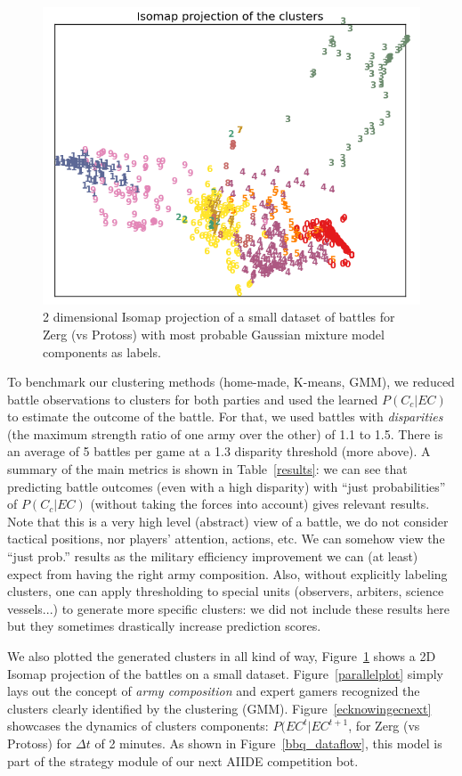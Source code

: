 \begin{figure}[htp]
\centerline{\includegraphics[width=0.55\columnwidth]{images/GMM_ISO_Z2.png}}
\label{isoz}
\caption{2 dimensional Isomap projection of a small dataset of battles for Zerg (vs Protoss) with most probable Gaussian mixture model components as labels.}
\vspace{-0.2cm}
\end{figure}

To benchmark our clustering methods (home-made, K-means, GMM), we reduced battle observations to clusters for both parties and used the learned $P(C_c|EC)$ to estimate the outcome of the battle. For that, we used battles with \textit{disparities} (the maximum strength ratio of one army over the other) of 1.1 to 1.5. There is an average of 5 battles per game at a 1.3 disparity threshold (more above). A summary of the main metrics is shown in Table~\ref{results}: we can see that predicting battle outcomes (even with a high disparity) with ``just probabilities'' of $P(C_c|EC)$ (without taking the forces into account) gives relevant results. Note that this is a very high level (abstract) view of a battle, we do not consider tactical positions, nor players' attention, actions, etc. We can somehow view the ``just prob.'' results as the military efficiency improvement we can (at least) expect from having the right army composition. Also, without explicitly labeling clusters, one can apply thresholding to special units (observers, arbiters, science vessels...) to generate more specific clusters: we did not include these results here but they sometimes drastically increase prediction scores.

We also plotted the generated clusters in all kind of way, Figure~\ref{isoz} shows a 2D Isomap projection of the battles on a small dataset. Figure~\ref{parallelplot} simply lays out the concept of \textit{army composition} and expert gamers recognized the clusters clearly identified by the clustering (GMM). Figure~\ref{ecknowingecnext} showcases the dynamics of clusters components: $P(EC^t|EC^{t+1}$, for Zerg (vs Protoss) for $\Delta t$ of 2 minutes. As shown in Figure~\ref{bbq_dataflow}, this model is part of the strategy module of our next AIIDE competition bot.

